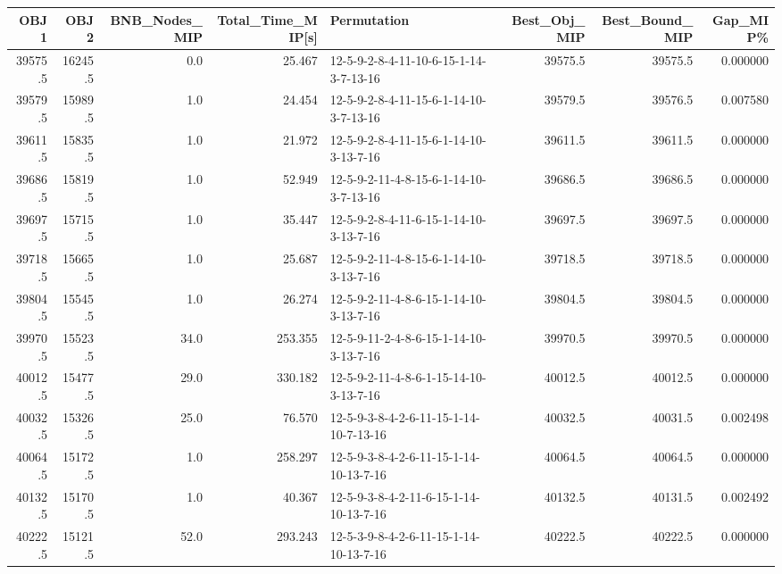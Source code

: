 \begin{tabular}{rrrrlrrr}
\toprule
    OBJ1 &     OBJ2 &  BNB\_Nodes\_MIP &  Total\_Time\_MIP[s] &                             Permutation &  Best\_Obj\_MIP &  Best\_Bound\_MIP &  Gap\_MIP\% \\
\midrule
 39575.5 &  16245.5 &            0.0 &             25.467 &  12-5-9-2-8-4-11-10-6-15-1-14-3-7-13-16 &       39575.5 &         39575.5 &  0.000000 \\
 39579.5 &  15989.5 &            1.0 &             24.454 &  12-5-9-2-8-4-11-15-6-1-14-10-3-7-13-16 &       39579.5 &         39576.5 &  0.007580 \\
 39611.5 &  15835.5 &            1.0 &             21.972 &  12-5-9-2-8-4-11-15-6-1-14-10-3-13-7-16 &       39611.5 &         39611.5 &  0.000000 \\
 39686.5 &  15819.5 &            1.0 &             52.949 &  12-5-9-2-11-4-8-15-6-1-14-10-3-7-13-16 &       39686.5 &         39686.5 &  0.000000 \\
 39697.5 &  15715.5 &            1.0 &             35.447 &  12-5-9-2-8-4-11-6-15-1-14-10-3-13-7-16 &       39697.5 &         39697.5 &  0.000000 \\
 39718.5 &  15665.5 &            1.0 &             25.687 &  12-5-9-2-11-4-8-15-6-1-14-10-3-13-7-16 &       39718.5 &         39718.5 &  0.000000 \\
 39804.5 &  15545.5 &            1.0 &             26.274 &  12-5-9-2-11-4-8-6-15-1-14-10-3-13-7-16 &       39804.5 &         39804.5 &  0.000000 \\
 39970.5 &  15523.5 &           34.0 &            253.355 &  12-5-9-11-2-4-8-6-15-1-14-10-3-13-7-16 &       39970.5 &         39970.5 &  0.000000 \\
 40012.5 &  15477.5 &           29.0 &            330.182 &  12-5-9-2-11-4-8-6-1-15-14-10-3-13-7-16 &       40012.5 &         40012.5 &  0.000000 \\
 40032.5 &  15326.5 &           25.0 &             76.570 &  12-5-9-3-8-4-2-6-11-15-1-14-10-7-13-16 &       40032.5 &         40031.5 &  0.002498 \\
 40064.5 &  15172.5 &            1.0 &            258.297 &  12-5-9-3-8-4-2-6-11-15-1-14-10-13-7-16 &       40064.5 &         40064.5 &  0.000000 \\
 40132.5 &  15170.5 &            1.0 &             40.367 &  12-5-9-3-8-4-2-11-6-15-1-14-10-13-7-16 &       40132.5 &         40131.5 &  0.002492 \\
 40222.5 &  15121.5 &           52.0 &            293.243 &  12-5-3-9-8-4-2-6-11-15-1-14-10-13-7-16 &       40222.5 &         40222.5 &  0.000000 \\

\end{tabular}
